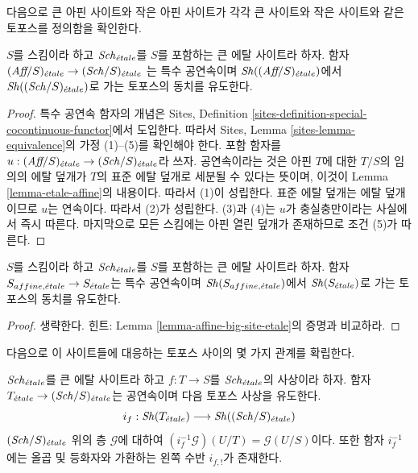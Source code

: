 \noindent
다음으로 큰 아핀 사이트와 작은 아핀 사이트가 각각 큰 사이트와 작은
사이트와 같은 토포스를 정의함을 확인한다.

\begin{lemma}
\label{lemma-affine-big-site-etale}
$S$를 스킴이라 하고 $\mathit{Sch}_{\acute{e}tale}$를 $S$를 포함하는 큰 에탈 사이트라
하자. 함자
$(\textit{Aff}/S)_{\acute{e}tale} \to (\mathit{Sch}/S)_{\acute{e}tale}$
는 특수 공연속이며 $\mathop{\mathit{Sh}}\nolimits((\textit{Aff}/S)_{\acute{e}tale})$에서
$\mathop{\mathit{Sh}}\nolimits((\mathit{Sch}/S)_{\acute{e}tale})$로 가는 토포스의 동치를 유도한다.
\end{lemma}

\begin{proof}
특수 공연속 함자의 개념은 Sites, Definition
\ref{sites-definition-special-cocontinuous-functor}에서 도입한다. 따라서
Sites, Lemma \ref{sites-lemma-equivalence}의 가정 (1)--(5)를 확인해야
한다. 포함 함자를
$u : (\textit{Aff}/S)_{\acute{e}tale} \to (\mathit{Sch}/S)_{\acute{e}tale}$라 쓰자. 공연속이라는
것은 아핀 $T$에 대한 $T/S$의 임의의 에탈 덮개가 $T$의 표준 에탈
덮개로 세분될 수 있다는 뜻이며, 이것이 Lemma
\ref{lemma-etale-affine}의 내용이다. 따라서 (1)이 성립한다. 표준 에탈
덮개는 에탈 덮개이므로 $u$는 연속이다. 따라서 (2)가 성립한다. (3)과
(4)는 $u$가 충실충만이라는 사실에서 즉시 따른다. 마지막으로 모든
스킴에는 아핀 열린 덮개가 존재하므로 조건 (5)가 따른다.
\end{proof}

\begin{lemma}
\label{lemma-alternative}
$S$를 스킴이라 하고 $\mathit{Sch}_{\acute{e}tale}$를 $S$를 포함하는 큰 에탈 사이트라
하자. 함자 $S_{affine, {\acute{e}tale}} \to S_{\acute{e}tale}$는 특수 공연속이며
$\mathop{\mathit{Sh}}\nolimits(S_{affine, {\acute{e}tale}})$에서 $\mathop{\mathit{Sh}}\nolimits(S_{\acute{e}tale})$로 가는 토포스의 동치를
유도한다.
\end{lemma}

\begin{proof}
생략한다. 힌트: Lemma \ref{lemma-affine-big-site-etale}의 증명과 비교하라.
\end{proof}

\noindent
다음으로 이 사이트들에 대응하는 토포스 사이의 몇 가지 관계를
확립한다.

\begin{lemma}
\label{lemma-put-in-T-etale}
$\mathit{Sch}_{\acute{e}tale}$를 큰 에탈 사이트라 하고
$f : T \to S$를 $\mathit{Sch}_{\acute{e}tale}$의 사상이라 하자. 함자
$T_{\acute{e}tale} \to (\mathit{Sch}/S)_{\acute{e}tale}$는 공연속이며 다음 토포스 사상을
유도한다.
$$
i_f :
\mathop{\mathit{Sh}}\nolimits(T_{\acute{e}tale})
\longrightarrow
\mathop{\mathit{Sh}}\nolimits((\mathit{Sch}/S)_{\acute{e}tale})
$$
$(\mathit{Sch}/S)_{\acute{e}tale}$ 위의 층 $\mathcal{G}$에 대하여
$(i_f^{-1}\mathcal{G})(U/T) = \mathcal{G}(U/S)$이다. 또한 함자
$i_f^{-1}$에는 올곱 및 등화자와 가환하는 왼쪽 수반 $i_{f, !}$가
존재한다.
\end{lemma}

